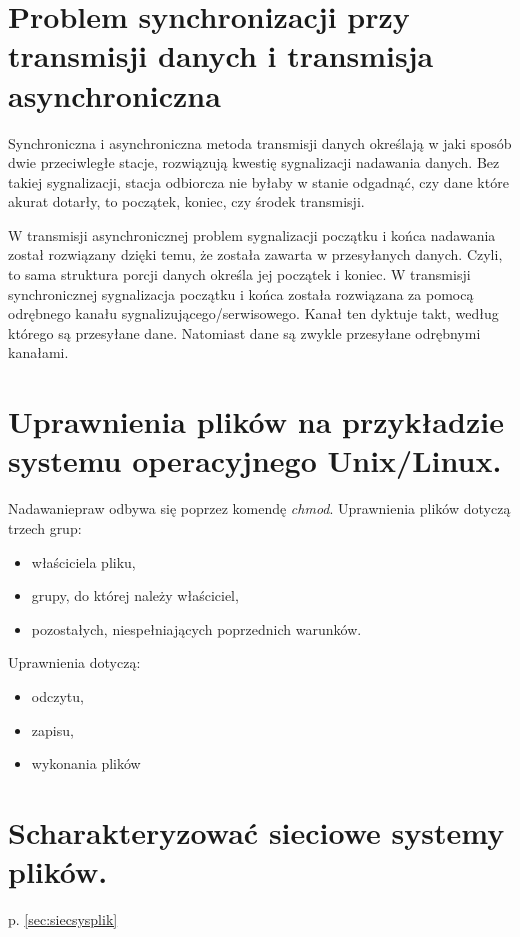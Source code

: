 \documentclass[12pt,a4paper]{article}
\begin{document}
	\section{Problem synchronizacji przy transmisji danych i transmisja asynchroniczna}
	Synchroniczna i asynchroniczna metoda transmisji danych określają w jaki sposób dwie przeciwległe stacje, rozwiązują kwestię sygnalizacji nadawania danych. Bez takiej sygnalizacji, stacja odbiorcza nie byłaby w stanie odgadnąć, czy dane które akurat dotarły, to początek, koniec, czy środek transmisji.

	W transmisji asynchronicznej problem sygnalizacji początku i końca nadawania został rozwiązany dzięki temu, że została zawarta w przesyłanych danych. Czyli, to sama struktura porcji danych określa jej początek i koniec.
	W transmisji synchronicznej sygnalizacja początku i końca została rozwiązana za pomocą odrębnego kanału sygnalizującego/serwisowego. Kanał ten dyktuje takt, według którego są przesyłane dane. Natomiast dane są zwykle przesyłane odrębnymi kanałami.

	\section{Uprawnienia plików na przykładzie systemu operacyjnego Unix/Linux.}
	Nadawaniepraw odbywa się poprzez komendę \textit{chmod}. Uprawnienia plików dotyczą trzech grup:
	\begin{itemize}
		\item właściciela pliku,
		\item grupy, do której należy właściciel,
		\item pozostałych, niespełniających poprzednich warunków.
	\end{itemize}
	
	Uprawnienia dotyczą:
	\begin{itemize}
		\item odczytu,
		\item zapisu,
		\item wykonania plików
	\end{itemize}

	\section{Scharakteryzować sieciowe systemy plików.}
	p. \ref{sec:siecsysplik}
\end{document}
